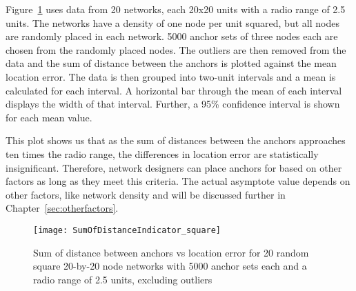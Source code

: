 Figure~\ref{fig:sumOfDistanceIndicator} uses data from 20 networks, each 20x20 units with a radio range of 2.5 units.  The networks have a density of one node per unit squared, but all nodes are randomly placed in each network.  5000 anchor sets of three nodes each are chosen from the randomly placed nodes.  The outliers are then removed from the data and the sum of distance between the anchors is plotted against the mean location error.  The data is then grouped into two-unit intervals and a mean is calculated for each interval.  A horizontal bar through the mean of each interval displays the width of that interval.  Further, a 95\% confidence interval is shown for each mean value.  

This plot shows us that as the sum of distances between the anchors approaches ten times the radio range, the differences in location error are statistically insignificant.  Therefore, network designers can place anchors for based on other factors as long as they meet this criteria.  The actual asymptote value depends on other factors, like network density and will be discussed further in Chapter~\ref{sec:otherfactors}.

\begin{figure}
  \centering
	\texttt{[image: SumOfDistanceIndicator\_square]}
	\caption[Sum of distance between anchors vs location error]{Sum of distance between anchors vs location error for 20 random square 20-by-20 node networks with 5000 anchor sets each and a radio range of 2.5 units, excluding outliers}
	\label{fig:sumOfDistanceIndicator}
\end{figure}


